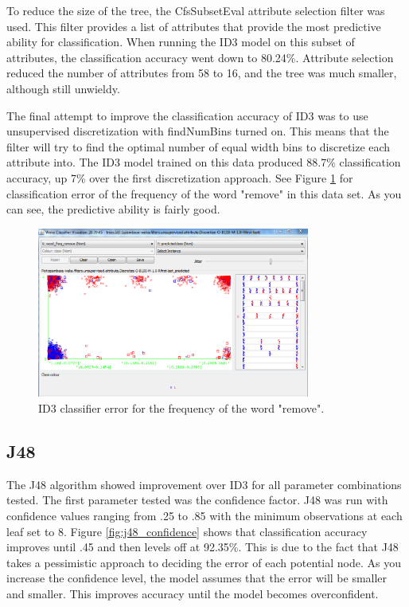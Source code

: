 \documentclass[11pt]{article}
\begin{document}
To reduce the size of the tree, the CfsSubsetEval attribute selection filter was used. This filter provides a list of attributes that provide the most predictive ability for classification. When running the ID3 model on this subset of attributes, the classification accuracy went down to 80.24\%. Attribute selection reduced the number of attributes from 58 to 16, and the tree was much smaller, although still unwieldy.

The final attempt to improve the classification accuracy of ID3 was to use unsupervised discretization with findNumBins turned on. This means that the filter will try to find the optimal number of equal width bins to discretize each attribute into. The ID3 model trained on this data produced 88.7\% classification accuracy, up 7\% over the first discretization approach. See Figure \ref{fig:id3_remove_error} for classification error of the frequency of the word "remove" in this data set. As you can see, the predictive ability is fairly good.
\begin{figure}[here]
	\centering	
	\includegraphics[width=0.8\textwidth]{eps/id3_unsupDiscrete_wordRemoveError}
	\caption{ID3 classifier error for the frequency of the word "remove".}
	\label{fig:id3_remove_error}
\end{figure}

\subsection{J48}
The J48 algorithm showed improvement over ID3 for all parameter combinations tested. The first parameter tested was the confidence factor. J48 was run with confidence values ranging from .25 to .85 with the minimum observations at each leaf set to 8. Figure \ref{fig:j48_confidence} shows that classification accuracy improves until .45 and then levels off at 92.35\%. This is due to the fact that J48 takes a pessimistic approach to deciding the error of each potential node. As you increase the confidence level, the model assumes that the error will be smaller and smaller. This improves accuracy until the model becomes overconfident.
\end{document}
